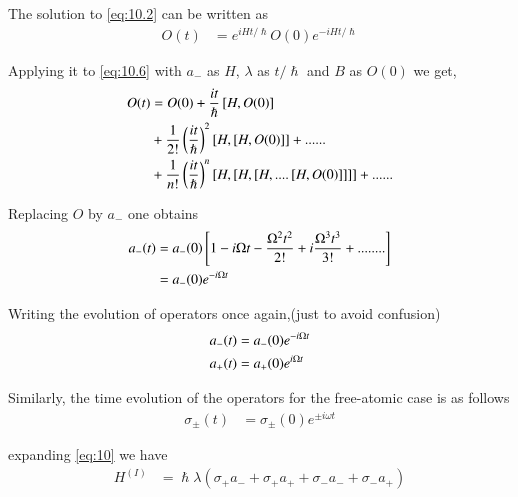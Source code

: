 The solution to \eqref{eq:10.2} can be written as
\begin{align}\label{eq:10.6}
O(t)&={ e }^{ iH t/\hslash  }O (0){ e }^{ -iH t/\hslash  }
\end{align}


Applying it to \eqref{eq:10.6} with $a_{-}$ as $H$, $\lambda$ as $t/\hslash$ and  $B$ as $O (0)$ we get,
 \begin{align}\label{eq:10.7}
 O(t)&=O(0)+\frac { it }{ \hslash  } \left[ H ,O (0) \right]\notag \\ 
&+\frac { 1 }{ 2 !}\left(\frac { it }{ \hslash} \right)^{2}\left[H,\left[H,O(0)\right]\right]+......\notag\\
&+\frac { 1 }{ n !}\left(\frac { it }{ \hslash} \right)^{n}\left[H,\left[H,\left[H,....\left[H,O(0)\right]\right]\right]\right]+......
 \end{align}

Replacing $O$ by $a_{-}$ one obtains
\begin{align}\label{eq:10.8}
a_{-} (t)&=a_{-} (0)\left[ 1-i\Omega t-\frac { { \Omega  }^{ 2 }{ t }^{ 2 } }{ 2! } +i\frac { { \Omega  }^{ 3 }{ t }^{ 3 } }{ 3! } +........ \right] \notag \\
&=a_{-} (0){ e }^{ -i\Omega t }
\end{align}


Writing the evolution of operators once again,(just to avoid confusion)
\begin{align}\label{eq:11}
a_{-}(t)&=a_{-}(0){e}^{-i{\Omega}t}\\ \notag 
a_{+}(t)&=a_{+}(0){e}^{i{\Omega}t}
\end{align}

Similarly,  the time evolution of the operators for the free-atomic case is as follows
\begin{align}\label{eq:12}
\sigma_{\pm}(t)&=\sigma_{\pm}(0){e}^{\pm{i}{\omega}t}
\end{align}

expanding \eqref{eq:10} we have %
\begin{align}\label{eq:13}
H^{(I)}&= \hslash\lambda(\sigma_{+} {a}_{-} + \sigma_{+}a_{+} + \sigma_{-} a_{-} + \sigma_{-}a_{+} )
\end{align}

